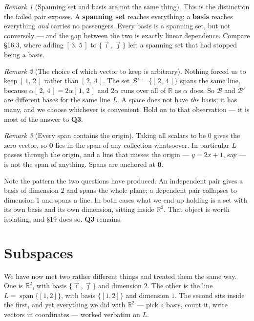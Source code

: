 \documentclass[11pt]{article}
\theoremstyle{definition}
\theoremstyle{remark}
\newtheorem*{rmk}{Remark}
\newcommand{\R}{\mathbb{R}}
\newcommand{\vc}[1]{\mathbf{#1}}
\newcommand{\ivec}{\vec{\imath}}
\newcommand{\jvec}{\vec{\jmath}}
\newcommand{\bas}{\mathcal{B}}
\DeclareMathOperator{\spanop}{span}   %
\begin{document}
\begin{rmk}[Spanning set and basis are not the same thing]
This is the distinction the failed pair exposes. A \textbf{spanning set} reaches
everything; a \textbf{basis} reaches everything \emph{and} carries no
passengers. Every basis is a spanning set, but not conversely --- and the gap
between the two is exactly linear dependence. Compare \S16.3, where adding
$[\,3,\,5\,]$ to $\{\ivec,\jvec\}$ left a spanning set that had stopped being a
basis.
\end{rmk}

\begin{rmk}[The choice of which vector to keep is arbitrary]
Nothing forced us to keep $[\,1,\,2\,]$ rather than $[\,2,\,4\,]$. The set
$\bas'=\{[\,2,\,4\,]\}$ spans the same line, because
$\alpha[\,2,\,4\,]=2\alpha[\,1,\,2\,]$ and $2\alpha$ runs over all of $\R$ as
$\alpha$ does. So $\bas$ and $\bas'$ are different bases for the same line $L$.
A space does not have \emph{the} basis; it has many, and we choose whichever is
convenient. Hold on to that observation --- it is most of the answer to
\textbf{Q3}.
\end{rmk}

\begin{rmk}[Every span contains the origin]
Taking all scalars to be $0$ gives the zero vector, so $\vc{0}$ lies in the span
of any collection whatsoever. In particular $L$ passes through the origin, and a
line that misses the origin --- $y=2x+1$, say --- is not the span of anything.
Spans are anchored at $\vc{0}$.
\end{rmk}

\noindent Note the pattern the two questions have produced. An independent pair
gives a basis of dimension $2$ and spans the whole plane; a dependent pair
collapses to dimension $1$ and spans a line. In both cases what we end up
holding is a set with its own basis and its own dimension, sitting inside
$\R^{2}$. That object is worth isolating, and \S19 does so. \textbf{Q3} remains.

\section{Subspaces}
We have now met two rather different things and treated them the same way. One
is $\R^{2}$, with basis $\{\ivec,\jvec\}$ and dimension $2$. The other is the
line $L=\spanop\{[1,2]\}$, with basis $\{[1,2]\}$ and dimension $1$. The second
sits inside the first, and yet everything we did with $\R^{2}$ --- pick a basis,
count it, write vectors in coordinates --- worked verbatim on $L$.
\end{document}
